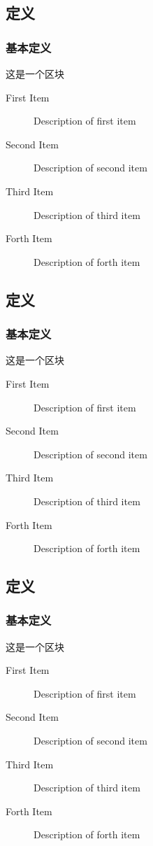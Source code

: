 \documentclass[11pt,c,compress,UTF8]{ctexbeamer}
\begin{document}
\subsection{定义}
\begin{frame} 
\frametitle{基本定义}
\begin{block}{}
        这是一个区块
\end{block}
\begin{description}
\item[First Item] Description of first item
\item[Second Item] Description of second item
\item[Third Item] Description of third item
\item[Forth Item] Description of forth item
\end{description}
\end{frame}

\subsection{定义}
\begin{frame} 
\frametitle{基本定义}
\begin{block}{}
        这是一个区块
\end{block}
\begin{description}
\item[First Item] Description of first item
\item[Second Item] Description of second item
\item[Third Item] Description of third item
\item[Forth Item] Description of forth item
\end{description}
\end{frame}

\subsection{定义}
\begin{frame} 
\frametitle{基本定义}
\begin{block}{}
        这是一个区块
\end{block}
\begin{description}
\item[First Item] Description of first item
\item[Second Item] Description of second item
\item[Third Item] Description of third item
\item[Forth Item] Description of forth item
\end{description}
\end{frame}
\end{document}
